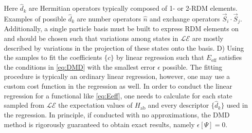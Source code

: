 \documentclass{article}
\begin{document}
Here $\hat{d}_k$ are Hermitian operators typically composed of 1- or 2-RDM elements. 
Examples of possible $\hat{d}_k$ are number operators $\hat{n}$ and exchange operators $\vec{S}_i \cdot \vec{S}_j$.
Additionally, a single particle basis must be built to express RDM elements on and should be chosen such that variations among states in $\mathcal{LE}$ are mostly described by variations in the projection of these states onto the basis.
D) Using the samples to fit the coefficients $\{c\}$ by linear regression such that $E_\text{eff}$ satisfies the conditions in \eqref{eq:DMD} with the smallest error $\epsilon$ possible. 
The fitting procedure is typically an ordinary linear regression, however, one may use a custom cost function in the regression as well. 
In order to conduct the linear regression for a functional like \eqref{eq:Eeff}, one needs to calculate for each state sampled from $\mathcal{LE}$ the expectation values of $H_\text{ab}$ and every descriptor $\{\hat{d}_k\}$ used in the regression.
In principle, if conducted with no approximations, the DMD method is rigorously guaranteed to obtain exact results, namely $\epsilon[\Psi] = 0$.
\end{document}
